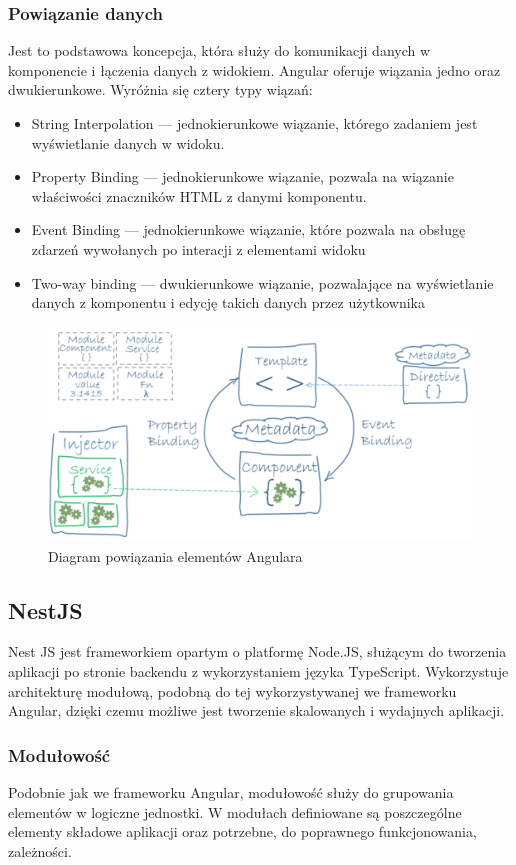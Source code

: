 \subsubsection{Powiązanie danych}
Jest to podstawowa koncepcja, która służy do komunikacji danych w komponencie i łączenia danych z widokiem. Angular oferuje wiązania jedno oraz dwukierunkowe. Wyróżnia się cztery typy wiązań:
\begin{itemize}
  \item String Interpolation --- jednokierunkowe wiązanie, którego zadaniem jest wyświetlanie danych w widoku. 
  \item Property Binding --- jednokierunkowe wiązanie, pozwala na wiązanie właściwości znaczników HTML z danymi komponentu.
  \item Event Binding --- jednokierunkowe wiązanie, które pozwala na obsługę zdarzeń wywołanych po interacji z elementami widoku
  \item Two-way binding --- dwukierunkowe wiązanie, pozwalające na wyświetlanie danych z komponentu i edycję takich danych przez użytkownika 
\end{itemize}

\begin{figure}[ht]
	\centering
		\includegraphics[width=0.6\linewidth]{imgs/ang-diag-1.png}
	\caption{Diagram powiązania elementów Angulara}
	\label{fig:wiazanie-elementow-angular}
\end{figure}

\subsection{NestJS}
Nest JS jest frameworkiem opartym o platformę Node.JS, służącym do tworzenia aplikacji po stronie backendu z wykorzystaniem języka TypeScript. Wykorzystuje architekturę modułową, podobną do tej wykorzystywanej we frameworku Angular, dzięki czemu możliwe jest tworzenie skalowanych i wydajnych aplikacji.
\subsubsection{Modułowość}
Podobnie jak we frameworku Angular, modułowość służy do grupowania elementów w logiczne jednostki. W modułach definiowane są poszczególne elementy składowe aplikacji oraz potrzebne, do poprawnego funkcjonowania, zależności.

